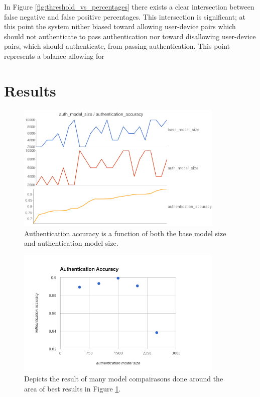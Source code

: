 \documentclass{acm_proc_article-sp}
\begin{document}
In Figure \ref{fig:threshold_vs_percentages} there exists a clear intersection between false negative and false positive percentages. This intersection is significant; at this point the system nither biased toward allowing user-device pairs which should not authenticate to pass authentication nor toward disallowing user-device pairs, which should authenticate, from passing authentication. This point represents a balance allowing for %

\section{Results}
\label{sec:results}
\begin{figure}
\centering
\includegraphics[width=3.9in]{authentication_accuracy_vs_model_size.png}
\caption{Authentication accuracy is a function of both the base model size and authentication model size.}
\label{fig:authentication_accuracy}
\end{figure}
%
\begin{figure}
\centering
\includegraphics[width=3.9in]{extensive_authentication_accuracy.png}
\caption{Depicts the result of many model compairasons done around the area of best results in Figure \ref{fig:authentication_accuracy}.}
\label{fig:extensive_authentication_accuracy}
\end{figure}
\end{document}
